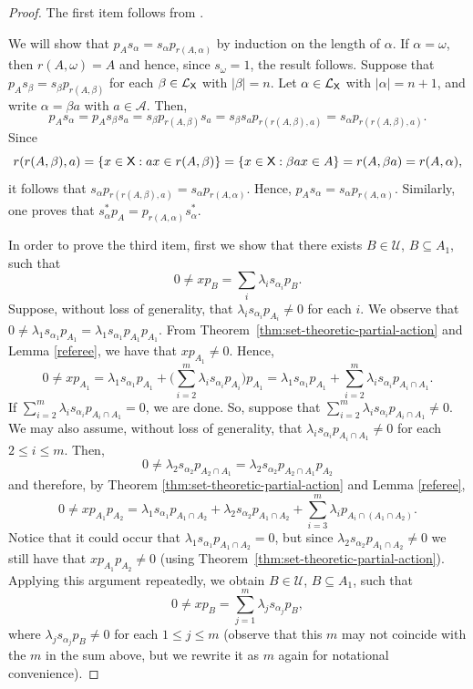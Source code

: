 \documentclass[a4paper,12pt]{amsart}
\theoremstyle{definition}
\theoremstyle{remark}
\numberwithin{equation}{section}
\newcommand{\osf}{{\normalfont \textsf{X}}}
\newcommand{\lang}{\CL_{\osf}}
\newcommand{\alf}{\mathscr{A}}
\newcommand{\CL}{\mathcal{L}}
\newcommand{\TCB}{\mathcal{U}}
\begin{document}
\begin{proof} The first item follows from \cite[Proposition 3.6 (i)]{BGGV}. 

We will show that $p_A s_\alpha=s_\alpha p_{r(A,\alpha)}$ by induction on the length of $\alpha$. If $\alpha=\omega$, then $r(A,\omega)=A$ and hence, since $s_\omega=1$, the result follows.
Suppose that $p_As_\beta=s_\beta p_{r(A,\beta)}$ for each $\beta \in \lang$ with $|\beta|=n$. Let $\alpha\in \lang$ with $|\alpha|=n+1$, and write $\alpha=\beta a$ with $a\in \alf$. 
Then, $$p_As_\alpha=p_A s_\beta s_a=s_\beta p_{r(A,\beta)}s_a=s_\beta s_a p_{r(r(A,\beta),a)}=s_\alpha p_{r(r(A,\beta),a)}.$$  
Since $$r(r(A,\beta),a)=\{x\in \osf: ax\in r(A,\beta)\}=\{x\in \osf: \beta ax\in A\}=r(A,\beta a)=r(A,\alpha),$$
it follows that $s_\alpha p_{r(r(A,\beta),a)}=s_\alpha p_{r(A,\alpha)}$. Hence, $p_As_\alpha=s_\alpha p_{r(A,\alpha)}$. Similarly, one proves that $s_\alpha^*p_A=p_{r(A,\alpha)}s_\alpha^*$.

In order to prove the third item, first we show that there exists $B \in \TCB$, $B\subseteq A_1$, such that $$0\neq xp_B=\sum\limits_i \lambda_i s_{\alpha_i}p_B.$$ Suppose, without loss of generality, that $\lambda_i s_{\alpha_i} p_{A_i}\neq 0$
 for each $i$. We observe that $0\neq \lambda_1 s_{\alpha_1} p_{A_1}=\lambda_1 s_{\alpha_1} p_{A_1}p_{A_1}$. From Theorem~\ref{thm:set-theoretic-partial-action} and Lemma \ref{referee}, we have that $xp_{A_1}\neq 0$. Hence, $$0\neq xp_{A_1}=\lambda_1 s_{\alpha_1}p_{A_1}+\big(\sum \limits_{i=2}^m\lambda_i s_{\alpha_i}p_{A_i}\big)p_{A_1}=\lambda_1 s_{\alpha_1}p_{A_1}+\sum \limits_{i=2}^m\lambda_i s_{\alpha_i}p_{A_i\cap A_1}.$$
  If $\sum \limits_{i=2}^m\lambda_i s_{\alpha_i}p_{A_i\cap A_1}=0$, we are done. So, suppose that $\sum \limits_{i=2}^m\lambda_i s_{\alpha_i}p_{A_i\cap A_1}\neq 0$. We may also assume, without loss of generality, that $\lambda_i s_{\alpha_i}p_{A_i\cap A_1}\neq 0$ for each $2\leq i \leq m$. Then, 
 $$0\neq \lambda_2s_{\alpha_2}p_{A_2\cap A_1}=\lambda_2s_{\alpha_2}p_{A_2\cap A_1}p_{A_2}$$ and therefore, by Theorem \ref{thm:set-theoretic-partial-action} and Lemma \ref{referee},
 $$0\neq xp_{A_1} p_{A_2}=\lambda_1 s_{{\alpha}_1}p_{A_1\cap A_2}+ \lambda_2 s_{\alpha_2} p_{A_1\cap A_2}+\sum\limits_{i=3}^m\lambda_i p_{A_i\cap (A_1\cap A_2)}.$$ Notice that it could occur that $\lambda_1 s_{\alpha_1}p_{A_1\cap A_2}=0$, but since $\lambda_2 s_{\alpha_2}p_{A_1\cap A_2}\neq 0 $ we still have that $xp_{A_1}p_{A_2}\neq 0$ (using Theorem~\ref{thm:set-theoretic-partial-action}). Applying this argument repeatedly,  we obtain $B\in \TCB$, $B\subseteq A_1$, such that $$0 \neq xp_B = \sum\limits_{j=1}^m \lambda_j s_{\alpha_j}p_B,$$ where $\lambda_j s_{\alpha_j} p_B \neq 0$ for each $1\leq j\leq m$ (observe that this $m$ may not coincide with the $m$ in the sum above, but we rewrite it as $m$ again for notational convenience). 
 

\end{proof}
\end{document}
